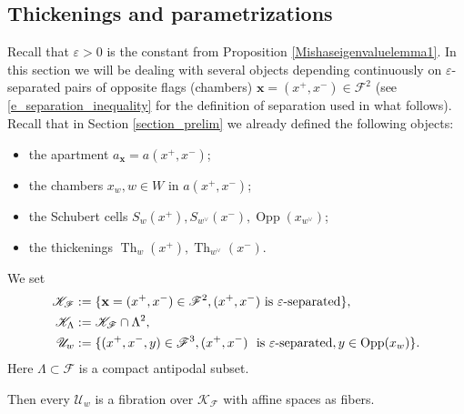 \documentclass[12pt]{amsbook}%
\theoremstyle{definition}
\theoremstyle{remark}
\numberwithin{section}{chapter}
\numberwithin{subsection}{section}
\numberwithin{figure}{chapter}
\DeclareMathOperator{\Th}{Th}
\DeclareMathOperator{\Opp}{Opp}
\def\cF{{\mathscr{F}}}
\def\cO{{\mathscr{O}}}
\def\bx{\mathbf{x}}
\def\La{\Lambda}
\def\mini{\scriptsize}
\def\kap{}
\begin{document}
{{\subsection{Thickenings and parametrizations}\label{sec:thickenings_parametrizations}

 
Recall that $\varepsilon>0$ is the constant from Proposition \ref{Mishaseigenvaluelemma1}. In this section we will be dealing with several objects depending continuously on $\varepsilon$-separated pairs of opposite flags (chambers) $\bx=(x^+,x^-)\in \cF^2$ (see \eqref{e_separation_inequality} for the definition of separation used in what follows). Recall that in Section \ref{section_prelim} we already defined the following objects:  
\begin{itemize}
\item the apartment $a_{\bx}=a(x^+, x^-)$; 
\item the chambers $x_w, w\in W$ in $a(x^+, x^-)$;
\item the Schubert cells $S_{w}(x^+), S_{w^\vee}(x^-), \Opp(x_{w^\vee})$;
\item the thickenings $\Th_{w}(x^+), \Th_{w^\vee}(x^-)$.
\end{itemize}
We set
\begin{align}\label{eq:bundle_separated_pairs}
\begin{aligned}
\mathscr{K}_\cF &:= \{\bx=(x^+,x^-)\in \cF^2, (x^+,x^-)\ \hbox{is}\ \varepsilon\text{-separated}\},\\
\mathscr{K}_\Lambda &:= \mathscr{K}_\cF \cap \Lambda^2,\\
\mathscr{U}_w &:=\{(x^+,x^-,y)\in \cF^3, (x^+,x^-) \  \ \hbox{is}\ \varepsilon\text{-separated}, y\in \Opp(x_w)\}.
\end{aligned}
\end{align}
Here $\La\subset \cF$ is a compact antipodal subset. 

Then %
every $\mathscr{U}_w$
 is a fibration over $\mathscr{K}_\cF$ 
with affine %
spaces as  fibers.

}}
\end{document}
